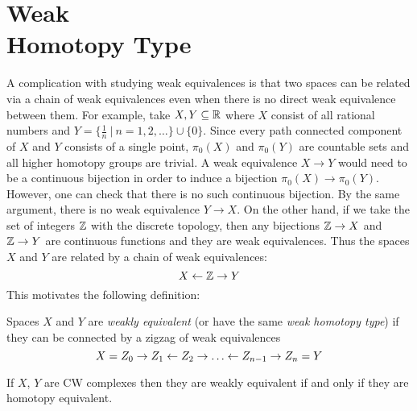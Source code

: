 

\chapter[Weak Homotopy Type]{Weak \\ Homotopy Type}
\label{WEAK HOMOTOPY TYPE CHAPTER}
\thispagestyle{firststyle}


A complication with studying weak equivalences is that two spaces can be related 
via a chain of weak equivalences even when there is no direct weak equivalence 
between them. For example, take $X, Y\subseteq {\mathbb R}$ where $X$ consist of all 
rational numbers and $Y = \{\frac{1}{n} \ | \  n = 1, 2, \dots\} \cup \{0 \}$. 
Since every path connected component of $X$ and $Y$ consists of a single point, 
$\pi_{0}(X)$ and $\pi_{0}(Y)$ are countable sets and all higher 
homotopy groups are trivial. A weak equivalence $X\to Y$ would need to be a 
continuous bijection in order to induce a bijection $\pi_{0}(X) \to \pi_{0}(Y)$. 
However, one can check that there is no such continuous bijection. 
By the same argument, there is no weak equivalence $Y\to X$. 
On the other hand, if we take the set of integers ${\mathbb Z}$ with 
the discrete topology, then any bijections ${\mathbb Z}\to X$ and ${\mathbb Z} \to Y$ are continuous 
functions and they are weak equivalences. Thus the spaces $X$ and $Y$ are related 
by a chain of weak equivalences: 
\[
X \leftarrow {\mathbb Z} \rightarrow Y 
\]
This motivates the following definition:

\begin{definition}
Spaces $X$ and $Y$ are \emph{weakly equivalent} 
(or have the same \emph{weak homotopy type}) if they can be connected 
by a zigzag of weak equivalences 
\[
X = Z_{0} \ra Z_{1} \la Z_{2} \ra \dots \la Z_{n-1} \ra Z_{n} = Y
\]
\end{definition}


\begin{proposition}
\label{CW COMPLEX WEAK TYPE PROP}
If $X$, $Y$ are CW complexes then they are weakly equivalent if and only if 
they are homotopy equivalent.
\end{proposition}

